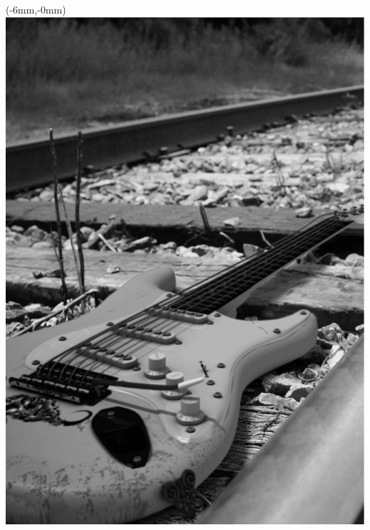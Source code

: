 \documentclass[a4paper,12pt]{article}
\begin{document}
\begin{titlepage}
\begin{textblock*}{297mm}(-6mm,-0mm)
\includegraphics[width=\paperwidth]
{frontpages/default}\end{textblock*} \
\end{titlepage}
\setlength{\columnseprule}{0.5pt}
\begin{multicols}{2}
\tableofcontents
\end{multicols}
\pagebreak
\end{document}
